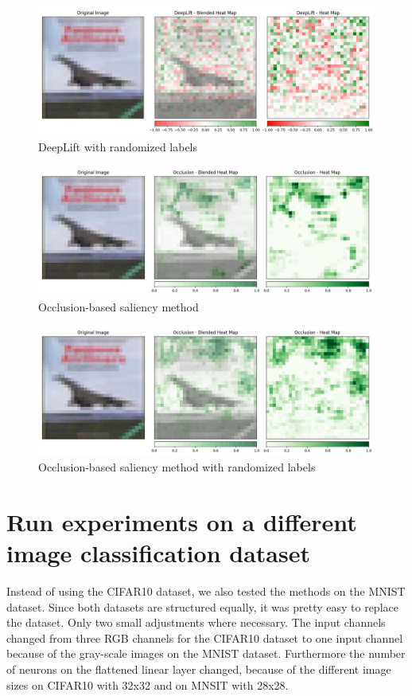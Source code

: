 \documentclass{article}
\begin{document}
\begin{figure}[h!]
\centering
\includegraphics[width=\textwidth]{results/DL_random_labels.png}
\caption{DeepLift with randomized labels}
\label{fig:DL_random_labels}
\end{figure}

\begin{figure}[h!]
\centering
\includegraphics[width=\textwidth]{results/OCC_normal.png}
\caption{Occlusion-based saliency method}
\label{fig:occ_normal}
\end{figure}

\begin{figure}[h!]
\centering
\includegraphics[width=\textwidth]{results/OCC_random_labels.png}
\caption{Occlusion-based saliency method with randomized labels}
\label{fig:occ_random_labels}
\end{figure}

\clearpage



\section{Run experiments on a different image classification dataset}
Instead of using the CIFAR10 dataset, we also tested the methods on the MNIST dataset. Since both datasets are structured equally, it was pretty easy to replace the dataset. Only two small adjustments where necessary. The input channels changed from three RGB channels for the CIFAR10 dataset to one input channel because of the gray-scale images on the MNIST dataset. Furthermore the number of neurons on the flattened linear layer changed, because of the different image sizes on CIFAR10 with 32x32 and on MNSIT with 28x28. 
\end{document}
